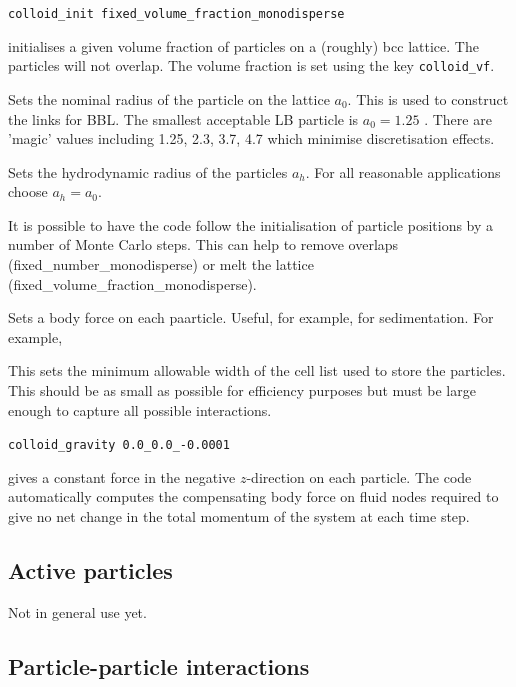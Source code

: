 \texttt{colloid\_init   fixed\_volume\_fraction\_monodisperse}

initialises a given volume fraction of particles on a (roughly)
bcc lattice. The particles will not overlap. The volume fraction
is set using the key \texttt{colloid\_vf}.


Sets the nominal radius of the particle on the lattice $a_0$. This is
used to construct the links for BBL. The smallest acceptable LB
particle is $a_0 = 1.25$ \cite{nl02}. There are 'magic' values
including 1.25, 2.3, 3.7, 4.7 which minimise discretisation effects.


Sets the hydrodynamic radius of the particles $a_h$. For all
reasonable applications choose $a_h = a_0$.


It is possible to have the code follow the initialisation of
particle positions by a number of Monte Carlo steps. This can
help to remove overlaps (fixed\_number\_monodisperse) or
melt the lattice (fixed\_volume\_fraction\_monodisperse).


Sets a body force on each paarticle. Useful, for example, for
sedimentation. For example,


This sets the minimum allowable width of the cell list used to
store the particles. This should be as small as possible for
efficiency purposes but must be large enough to capture all
possible interactions.

\texttt{colloid\_gravity  0.0\_0.0\_-0.0001}

gives a constant force in the negative $z$-direction on each particle.
The code automatically computes the compensating body force on fluid nodes
required to give no net change in the total momentum of the system at
each time step.

\subsection{Active particles}

Not in general use yet.


\subsection{Particle-particle interactions}


